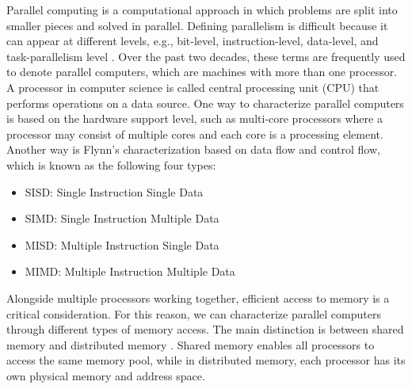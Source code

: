 Parallel computing is a computational approach in which problems are split into smaller pieces and solved in parallel. Defining parallelism is difficult because it can appear at different levels, e.g., bit-level, instruction-level, data-level, and task-parallelism level \cite{victor2010introhpc}. Over the past two decades, these terms are frequently used to denote parallel computers, which are machines with more than one processor. A processor in computer science is called central processing unit (CPU) that performs operations on a data source. One way to characterize parallel computers is based on the hardware support level, such as multi-core processors \cite{blake2009multicoreprocs} where a processor may consist of multiple cores and each core is a processing element. Another way is Flynn’s characterization \cite{flynn1972comtaxonomy} based on data flow and control flow, which is known as the following four types:
\begin{itemize}
	\item SISD: Single Instruction Single Data
	\item SIMD: Single Instruction Multiple Data
	\item MISD: Multiple Instruction Single Data
	\item MIMD: Multiple Instruction Multiple Data
\end{itemize}
Alongside multiple processors working together, efficient access to memory is a critical consideration. For this reason, we can characterize parallel computers through different types of memory access. The main distinction is between shared memory and distributed memory \cite{jacob2008numavsuma}. Shared memory enables all processors to access the same memory pool, while in distributed memory, each processor has its own physical memory and address space.\\

